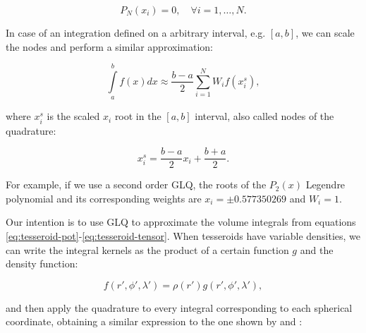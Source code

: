 \documentclass[extra]{gji}
\begin{document}
\begin{equation}
    P_N(x_i) = 0, \quad \forall i = {1,\dots,N}.
\end{equation}

In case of an integration defined on a arbitrary interval, e.g. $[a,b]$, we can scale the nodes and perform a similar approximation:

\begin{equation}
    \int\limits_a^b f(x) dx \approx \frac{b-a}{2} \sum_{i=1}^N W_i f(x_i^s),
\label{eq:glq-scaled}
\end{equation}

\noindent where $x_i^s$ is the scaled $x_i$ root in the $[a,b]$ interval, also called nodes of the quadrature:

\begin{equation}
    x_i^s = \frac{b-a}{2} x_i + \frac{b+a}{2}.
\end{equation}

For example, if we use a second order GLQ, the roots of the $P_2(x)$ Legendre polynomial and its corresponding weights are $x_i = \pm 0.577350269$ and $W_i = 1$.

Our intention is to use GLQ to approximate the volume integrals from equations \ref{eq:tesseroid-pot}-\ref{eq:tesseroid-tensor}. 
When tesseroids have variable densities, we can write the integral kernels as the product of a certain function $g$ and the density function:

\begin{equation}
    f(r', \phi', \lambda') = \rho(r') g(r', \phi', \lambda'),
\end{equation}

\noindent and then apply the quadrature to every integral corresponding to each spherical coordinate, obtaining a similar expression to the one shown by \citet{Asgharzadeh2007} and \citet{Uieda2016}:

\end{document}
